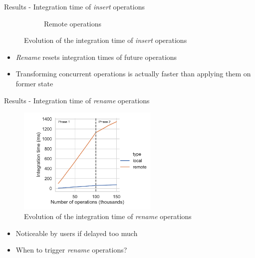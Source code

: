 \documentclass[10pt]{beamer}
\begin{document}
\begin{frame}{Results - Integration time of \emph{insert} operations}
\begin{figure}
\begin{subfigure}{0.47\textwidth}
        \caption{Remote operations}
        \label{fig:evolution-integration-time-remote-insert-remove}
    \end{subfigure}
    \caption{Evolution of the integration time of \emph{insert} operations}
    \label{fig:evolution-integration-time-insert-remove}
  \end{figure}

  \vspace{-1\baselineskip}
  \begin{itemize}
    \pause
    \item \emph{Rename} resets integration times of future operations
    \pause
    \item Transforming concurrent operations is actually faster than applying them on former state
  \end{itemize}

\end{frame}

\begin{frame}{Results - Integration time of \emph{rename} operations}
  \begin{figure}
    \centering
    \includegraphics[width=0.6\textwidth]{img/integration-time-rename-0.pdf}
    \caption{Evolution of the integration time of \emph{rename} operations}
    \label{fig:evolution-integration-time-rename}
  \end{figure}

  \vspace{-1\baselineskip}
  \begin{itemize}
    \pause
    \item Noticeable by users if delayed too much
    \pause
    \item When to trigger \emph{rename} operations?
  \end{itemize}
\end{frame}
\end{document}
